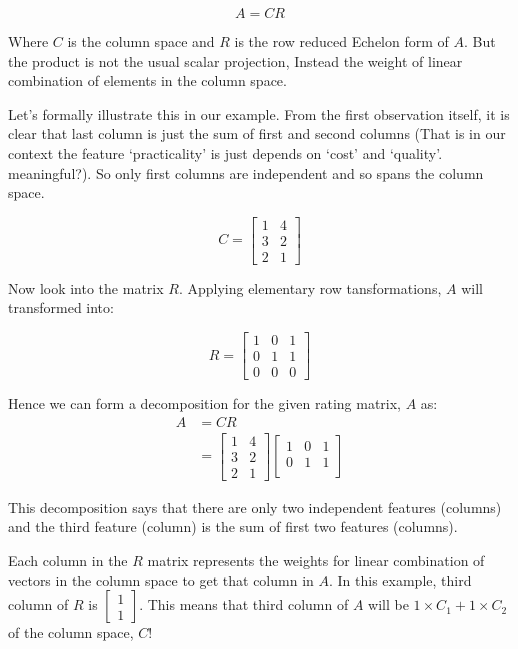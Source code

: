 \documentclass[
  letterpaper,
  DIV=11,
  numbers=noendperiod]{scrreprt}
\theoremstyle{plain}
\theoremstyle{definition}
\theoremstyle{remark}
\begin{document}
\[A=CR\]

Where \(C\) is the column space and \(R\) is the row reduced Echelon
form of \(A\). But the product is not the usual scalar projection,
Instead the weight of linear combination of elements in the column
space.

Let's formally illustrate this in our example. From the first
observation itself, it is clear that last column is just the sum of
first and second columns (That is in our context the feature
`practicality' is just depends on `cost' and `quality'. meaningful?). So
only first columns are independent and so spans the column space.

\[C=\begin{bmatrix}1&4\\3&2\\2&1\end{bmatrix}\]

Now look into the matrix \(R\). Applying elementary row tansformations,
\(A\) will transformed into:

\[R=\begin{bmatrix}1&0&1\\0&1&1\\0&0&0\end{bmatrix}\]

Hence we can form a decomposition for the given rating matrix, \(A\) as:
\begin{align*}
A&=CR\\
&=\begin{bmatrix}1&4\\3&2\\2&1\end{bmatrix}\begin{bmatrix}1&0&1\\0&1&1\\\mbox{}&&\end{bmatrix}
\end{align*}

This decomposition says that there are only two independent features
(columns) and the third feature (column) is the sum of first two
features (columns).

\begin{tcolorbox}[enhanced jigsaw, opacityback=0, leftrule=.75mm, bottomrule=.15mm, titlerule=0mm, colback=white, rightrule=.15mm, coltitle=black, left=2mm, breakable, bottomtitle=1mm, toptitle=1mm, colbacktitle=quarto-callout-important-color!10!white, title=\textcolor{quarto-callout-important-color}{\faExclamation}\hspace{0.5em}{Interpretation of the \(R\) matrix}, arc=.35mm, toprule=.15mm, opacitybacktitle=0.6, colframe=quarto-callout-important-color-frame]

Each column in the \(R\) matrix represents the weights for linear
combination of vectors in the column space to get that column in \(A\).
In this example, third column of \(R\) is
\(\begin{bmatrix}1\\1\end{bmatrix}\). This means that third column of
\(A\) will be \(1\times C_1+1\times C_2\) of the column space, \(C\)!

\end{tcolorbox}
\end{document}
